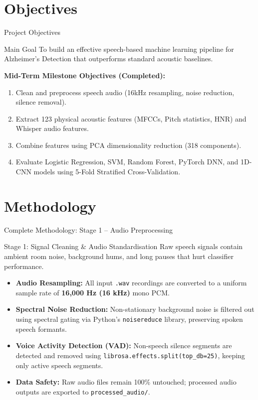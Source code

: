 \documentclass[aspectratio=169]{beamer}
\begin{document}
\section{Objectives}
\begin{frame}{Project Objectives}
    \begin{block}{Main Goal}
        To build an effective speech-based machine learning pipeline for Alzheimer's Detection that outperforms standard acoustic baselines.
    \end{block}
    
    \textbf{Mid-Term Milestone Objectives (Completed):}
    \begin{enumerate}
        \item Clean and preprocess speech audio (16kHz resampling, noise reduction, silence removal).
        \item Extract 123 physical acoustic features (MFCCs, Pitch statistics, HNR) and Whisper audio features.
        \item Combine features using PCA dimensionality reduction (318 components).
        \item Evaluate Logistic Regression, SVM, Random Forest, PyTorch DNN, and 1D-CNN models using 5-Fold Stratified Cross-Validation.
    \end{enumerate}
\end{frame}

\section{Methodology}
\begin{frame}{Complete Methodology: Stage 1 -- Audio Preprocessing}
    \begin{block}{Stage 1: Signal Cleaning \& Audio Standardisation}
        Raw speech signals contain ambient room noise, background hums, and long pauses that hurt classifier performance.
    \end{block}
    \begin{itemize}
        \item \textbf{Audio Resampling:} All input \texttt{.wav} recordings are converted to a uniform sample rate of \textbf{16,000 Hz (16 kHz)} mono PCM.
        \item \textbf{Spectral Noise Reduction:} Non-stationary background noise is filtered out using spectral gating via Python's \texttt{noisereduce} library, preserving spoken speech formants.
        \item \textbf{Voice Activity Detection (VAD):} Non-speech silence segments are detected and removed using \texttt{librosa.effects.split(top\_db=25)}, keeping only active speech segments.
        \item \textbf{Data Safety:} Raw audio files remain 100\% untouched; processed audio outputs are exported to \texttt{processed\_audio/}.
    \end{itemize}
\end{frame}
\end{document}
